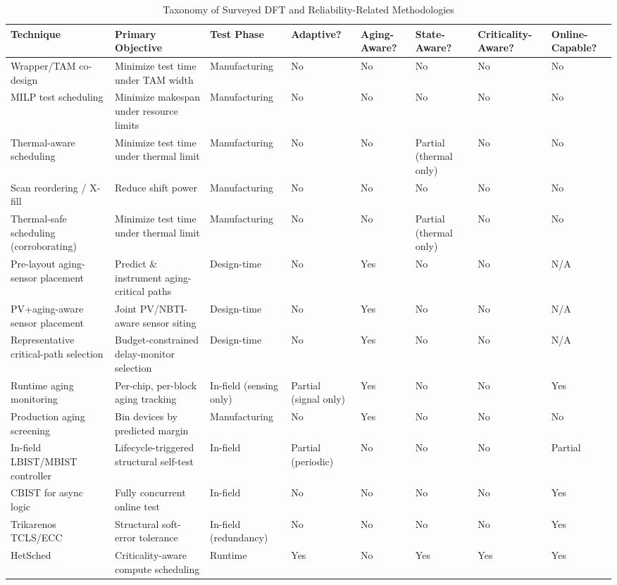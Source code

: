 \documentclass[journal]{IEEEtran}
\begin{document}
\begin{table}[t]
\caption{Taxonomy of Surveyed DFT and Reliability-Related Methodologies}
\label{tab:tax}
\centering\footnotesize
\begin{tabularx}{\textwidth}{@{}p{2.9cm}p{3.3cm}p{1.9cm}p{1.6cm}p{1.2cm}p{1.6cm}p{1.6cm}p{1.2cm}@{}}
\toprule
Technique & Primary Objective & Test Phase & Adaptive? & Aging-Aware? & State-Aware? & Criticality-Aware? & Online-Capable?\\
\midrule
Wrapper/TAM co-design \cite{r1} & Minimize test time under TAM width & Manufacturing & No & No & No & No & No\\
MILP test scheduling \cite{r2} & Minimize makespan under resource limits & Manufacturing & No & No & No & No & No\\
Thermal-aware scheduling \cite{r3} & Minimize test time under thermal limit & Manufacturing & No & No & Partial (thermal only) & No & No\\
Scan reordering / X-fill \cite{r11} & Reduce shift power & Manufacturing & No & No & No & No & No\\
Thermal-safe scheduling (corroborating) \cite{r12} & Minimize test time under thermal limit & Manufacturing & No & No & Partial (thermal only) & No & No\\
Pre-layout aging-sensor placement \cite{r4,r5} & Predict \& instrument aging-critical paths & Design-time & No & Yes & No & No & N/A\\
PV+aging-aware sensor placement \cite{r13} & Joint PV/NBTI-aware sensor siting & Design-time & No & Yes & No & No & N/A\\
Representative critical-path selection \cite{r14} & Budget-constrained delay-monitor selection & Design-time & No & Yes & No & No & N/A\\
Runtime aging monitoring \cite{r6,r15} & Per-chip, per-block aging tracking & In-field (sensing only) & Partial (signal only) & Yes & No & No & Yes\\
Production aging screening \cite{r7} & Bin devices by predicted margin & Manufacturing & No & Yes & No & No & No\\
In-field LBIST/MBIST controller \cite{r9} & Lifecycle-triggered structural self-test & In-field & Partial (periodic) & No & No & No & Partial\\
CBIST for async logic \cite{r16} & Fully concurrent online test & In-field & No & No & No & No & Yes\\
Trikarenos TCLS/ECC \cite{r8,r17} & Structural soft-error tolerance & In-field (redundancy) & No & No & No & No & Yes\\
HetSched \cite{r18} & Criticality-aware compute scheduling & Runtime & Yes & No & Yes & Yes & Yes\\
\bottomrule
\end{tabularx}
\end{table}
\end{document}
